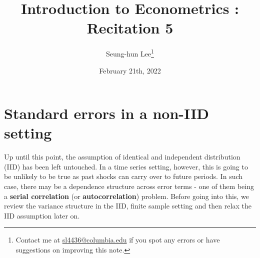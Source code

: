 \documentclass[12pt]{article}
\title{Introduction to Econometrics \ROM{2}: Recitation 5}
\theoremstyle{definition}
\theoremstyle{property}
\theoremstyle{assumption}
\theoremstyle{example}
\theoremstyle{comment}
\begin{document}
\linespread{1.25}
\onehalfspacing

\author{Seung-hun Lee\footnote{Contact me at \href{mailto:sl4436@columbia.edu}{sl4436@columbia.edu} if you spot any errors or have suggestions on improving this note.}}
\date{February 21th, 2022}
\maketitle
\thispagestyle{firstpage}

\section{Standard errors in a non-IID setting}
Up until this point, the assumption of identical and independent distribution (IID) has been left untouched. In a time series setting, however, this is going to be unlikely to be true as past shocks can carry over to future periods. In such case, there may be a dependence structure across error terms - one of them being a \textbf{serial correlation} (or \textbf{autocorrelation}) problem. Before going into this, we review the variance structure in the IID, finite sample setting and then relax the IID assumption later on. 
\end{document}
